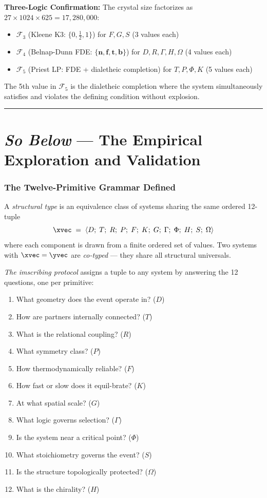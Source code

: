 \documentclass[12pt,a4paper]{article}
\begin{document}
\textbf{Three-Logic Confirmation:}
The crystal size factorizes as $27 \times 1024 \times 625 = 17,280,000$:
\begin{itemize}
    \item $\mathcal{F}_3$ (Kleene K3: $\{0, \frac12, 1\}$) for $F, G, S$ (3 values each)
    \item $\mathcal{F}_4$ (Belnap-Dunn FDE: $\{\mathbf{n}, \mathbf{f}, \mathbf{t}, \mathbf{b}\}$) for $D, R, \Gamma, H, \Omega$ (4 values each)
    \item $\mathcal{F}_5$ (Priest LP: FDE + dialetheic completion) for $T, P, \Phi, K$ (5 values each)
\end{itemize}
The 5th value in $\mathcal{F}_5$ is the dialetheic completion where the system simultaneously satisfies and violates the defining condition without explosion.

\bigbreak
\begin{center}
\rule{0.5\textwidth}{0.4pt}
\end{center}

\part{\textit{So Below} --- The Empirical Exploration and Validation}
\label{part:iii}

\section{The Twelve-Primitive Grammar Defined}

A \emph{structural type} is an equivalence class of systems sharing the same ordered 12-tuple
\[
\xvec \;=\; \langle D;\; T;\; R;\; P;\; F;\; K;\; G;\; \Gamma;\; \Phi;\; H;\; S;\; \Omega \rangle
\]
where each component is drawn from a finite ordered set of values. Two systems with $\xvec = \yvec$ are \emph{co-typed} --- they share all structural universals.

\textit{The imscribing protocol} assigns a tuple to any system by answering the 12 questions, one per primitive:
\begin{enumerate}
    \item What geometry does the event operate in? ($D$)
    \item How are partners internally connected? ($T$)
    \item What is the relational coupling? ($R$)
    \item What symmetry class? ($P$)
    \item How thermodynamically reliable? ($F$)
    \item How fast or slow does it equil-brate? ($K$)
    \item At what spatial scale? ($G$)
    \item What logic governs selection? ($\Gamma$)
    \item Is the system near a critical point? ($\Phi$)
    \item What stoichiometry governs the event? ($S$)
    \item Is the structure topologically protected? ($\Omega$)
    \item What is the chirality? ($H$)
\end{enumerate}
\end{document}
